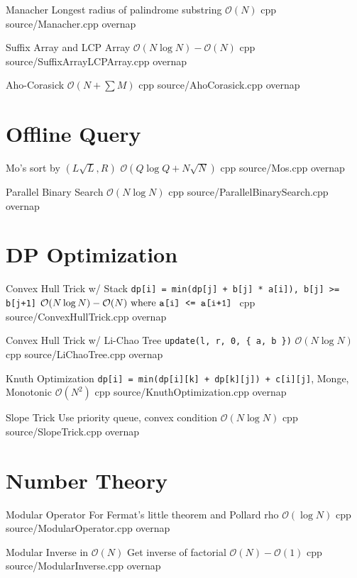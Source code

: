 \documentclass[landscape, 10pt, a4paper, oneside, twocolumn]{extarticle}
\begin{document}
\Algorithm
{Manacher}
{Longest radius of palindrome substring}
{$\mathcal{O}(N)$}
{cpp}
{source/Manacher.cpp}
{overnap}

\Algorithm
{Suffix Array and LCP Array}
{}
{$\mathcal{O}(N\log{N})-\mathcal{O}(N)$}
{cpp}
{source/SuffixArrayLCPArray.cpp}
{overnap}

\Algorithm
{Aho-Corasick}
{}
{$\mathcal{O}(N+\sum{M})$}
{cpp}
{source/AhoCorasick.cpp}
{overnap}


\section{Offline Query}

\Algorithm
{Mo's}
{sort by $(L\sqrt{L}, R)$}
{$\mathcal{O}(Q\log{Q}+N\sqrt{N})$}
{cpp}
{source/Mos.cpp}
{overnap}

\Algorithm
{Parallel Binary Search}
{}
{$\mathcal{O}(N\log{N})$}
{cpp}
{source/ParallelBinarySearch.cpp}
{overnap}


\section{DP Optimization}

\Algorithm
{Convex Hull Trick w/ Stack}
{\texttt{dp[i] = min(dp[j] + b[j] * a[i]), b[j] >= b[j+1]}}
{$\mathcal{O}(N\log{N})-\mathcal{O}(N)\text{ where \texttt{a[i] <= a[i+1]} }$}
{cpp}
{source/ConvexHullTrick.cpp}
{overnap}

\Algorithm
{Convex Hull Trick w/ Li-Chao Tree}
{\texttt{update(l, r, 0, \{ a, b \})}}
{$\mathcal{O}(N\log{N})$}
{cpp}
{source/LiChaoTree.cpp}
{overnap}

\Algorithm
{Knuth Optimization}
{\texttt{dp[i] = min(dp[i][k] + dp[k][j]) + c[i][j]}, Monge, Monotonic}
{$\mathcal{O}(N^2)$}
{cpp}
{source/KnuthOptimization.cpp}
{overnap}

\Algorithm
{Slope Trick}
{Use priority queue, convex condition}
{$\mathcal{O}(N\log{N})$}
{cpp}
{source/SlopeTrick.cpp}
{overnap}


\section{Number Theory}

\Algorithm
{Modular Operator}
{For Fermat's little theorem and Pollard rho}
{$\mathcal{O}(\log{N})$}
{cpp}
{source/ModularOperator.cpp}
{overnap}

\Algorithm
{Modular Inverse in $\mathcal{O}(N)$}
{Get inverse of factorial}
{$\mathcal{O}(N)-\mathcal{O}(1)$}
{cpp}
{source/ModularInverse.cpp}
{overnap}
\end{document}
